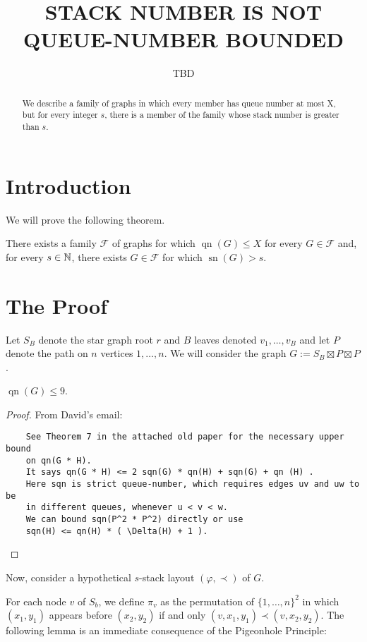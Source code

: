 \documentclass[kpfonts]{patmorin}
\title{\MakeUppercase{Stack Number is not Queue-Number Bounded}}
\author{TBD}
\DeclareMathOperator{\sn}{sn}
\DeclareMathOperator{\qn}{qn}
\begin{document}
\maketitle

\begin{abstract}
  We describe a family of graphs in which every member has queue number at most X, but for every integer $s$, there is a member of the family whose stack number is greater than $s$.
\end{abstract}

\section{Introduction}

We will prove the following theorem.

\begin{thm}
  There exists a family $\mathcal{F}$ of graphs for which $\qn(G)\le X$ for every $G\in\mathcal{F}$ and, for every $s\in\mathbb{N}$, there exists $G\in\mathcal{F}$ for which $\sn(G)>s$.
\end{thm}

\section{The Proof}

Let $S_B$ denote the star graph root $r$ and $B$ leaves denoted $v_1,\ldots,v_B$ and let $P$ denote the path on $n$ vertices $1,\ldots,n$.  We will consider the graph $G:=S_B\boxtimes P\boxtimes P$.

\begin{lem}
    $\qn(G) \le 9$.
\end{lem}

\begin{proof}
From David's email:
\begin{verbatim}
    See Theorem 7 in the attached old paper for the necessary upper bound
    on qn(G * H).
    It says qn(G * H) <= 2 sqn(G) * qn(H) + sqn(G) + qn (H) .
    Here sqn is strict queue-number, which requires edges uv and uw to be
    in different queues, whenever u < v < w.
    We can bound sqn(P^2 * P^2) directly or use
    sqn(H) <= qn(H) * ( \Delta(H) + 1 ).
\end{verbatim}
\end{proof}

Now, consider a hypothetical $s$-stack layout $(\varphi,\prec)$ of $G$.

For each node $v$ of $S_b$, we define $\pi_v$ as the permutation of $\{1,\ldots,n\}^2$ in which $(x_1,y_1)$ appears before $(x_2,y_2)$ if and only $(v,x_1,y_1)\prec (v,x_2,y_2)$.  The following lemma is an immediate consequence of the Pigeonhole Principle:
\end{document}
